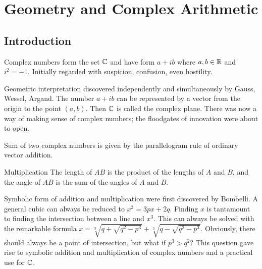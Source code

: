 \section{Geometry and Complex Arithmetic}

\begin{card}
    \subsection{Introduction}

    \begin{compactdesc}
    \item[Complex numbers] form the set $\mathbb{C}$ and
        have form $a + ib$ where $a,b\in\mathbb{R}$ and $i^2=-1$.
        Initially regarded with suspicion, confusion, even hostility.
    \item[Geometric interpretation] discovered independently and simultaneously
        by Gauss, Wessel, Argand. The number $a + ib$ can be represented by
        a vector from the origin to the point $(a,b)$. Then $\mathbb{C}$ is called the
        complex plane. There was now a way of making sense of complex numbers;
        the floodgates of innovation were about to open.
    \item[Sum] of two complex numbers is given by the parallelogram rule of
        ordinary vector addition.
    \item[Multiplication] The length of $AB$ is the product of the lengths of
        $A$ and $B$, and the angle of $AB$ is the sum of the angles of $A$ and
        $B$.
    \item[Symbolic form] of addition and multiplication were first discovered
        by Bombelli. A general cubic can always be reduced to $x^3 = 3px + 2q$.
        Finding $x$ is tantamount to finding the intersection between a line
        and $x^3$. This can always be solved with the remarkable formula
        $x = \sqrt[3]{q + \sqrt{q^2 - p^3}}
           + \sqrt[3]{q - \sqrt{q^2 - p^3}}$.
        Obviously, there should always be a point of intersection, but
        what if $p^3 > q^2$?
        This question gave rise to symbolic addition and multiplication of complex numbers
        and a practical use for $\mathbb{C}$.
    \end{compactdesc}
\end{card}
